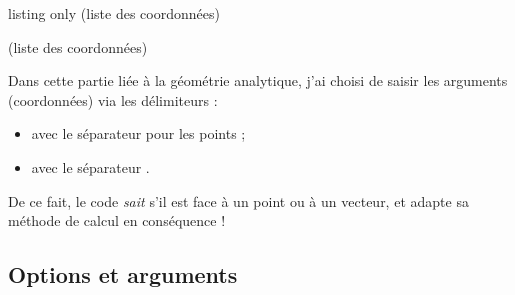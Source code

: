 \documentclass[a4paper,french,11pt]{article}
\newcommand\ctex[1]{\tcbox[vignettelatex]{#1}}
\begin{document}
\begin{PresCodeTexPL}{listing only}
(liste des coordonnées)

(liste des coordonnées)
\end{PresCodeTexPL}

\begin{warningblock}
Dans cette partie liée à la géométrie analytique, j'ai choisi de saisir les arguments (coordonnées) via les délimiteurs \ctex{(...)} :

\begin{itemize}
	\item avec le séparateur \ctex{,} pour les points ;
	\item avec le séparateur \ctex{;}.
\end{itemize}

De ce fait, le code \textit{sait} s'il est face à un point ou à un vecteur, et adapte sa méthode de calcul en conséquence !
\end{warningblock}

\subsection{Options et arguments}
\end{document}
